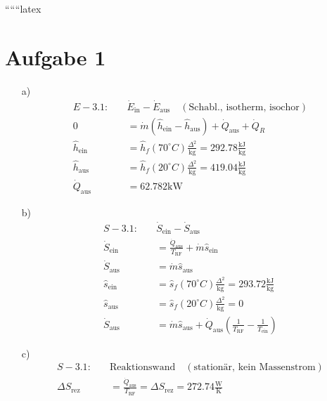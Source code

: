 
``````latex


\section*{Aufgabe 1}

\begin{itemize}
    \item[a)] 
    \begin{align*}
        E - 3.1: \quad & \dot{E}_{\text{in}} - \dot{E}_{\text{aus}} \quad (\text{Schabl., isotherm, isochor}) \\
        0 &= \dot{m} (\hat{h}_{\text{ein}} - \hat{h}_{\text{aus}}) + \dot{Q}_{\text{aus}} + \dot{Q}_R \\
        \hat{h}_{\text{ein}} &= \hat{h}_f (70^\circ C) \frac{\Delta^2}{\text{kg}} = 292.78 \frac{\text{kJ}}{\text{kg}} \\
        \hat{h}_{\text{aus}} &= \hat{h}_f (20^\circ C) \frac{\Delta^2}{\text{kg}} = 419.04 \frac{\text{kJ}}{\text{kg}} \\
        \dot{Q}_{\text{aus}} &= 62.782 \text{kW}
    \end{align*}

    \item[b)] 
    \begin{align*}
        S - 3.1: \quad & \dot{S}_{\text{ein}} - \dot{S}_{\text{aus}} \\
        \dot{S}_{\text{ein}} &= \frac{\dot{Q}_{\text{aus}}}{T_{\text{RF}}} + \dot{m} \hat{s}_{\text{ein}} \\
        \dot{S}_{\text{aus}} &= \dot{m} \hat{s}_{\text{aus}} \\
        \hat{s}_{\text{ein}} &= \hat{s}_f (70^\circ C) \frac{\Delta^2}{\text{kg}} = 293.72 \frac{\text{kJ}}{\text{kg}} \\
        \hat{s}_{\text{aus}} &= \hat{s}_f (20^\circ C) \frac{\Delta^2}{\text{kg}} = 0 \\
        \dot{S}_{\text{aus}} &= \dot{m} \hat{s}_{\text{aus}} + \dot{Q}_{\text{aus}} \left( \frac{1}{T_{\text{RF}}} - \frac{1}{T_{\text{ein}}} \right)
    \end{align*}

    \item[c)] 
    \begin{align*}
        S - 3.1: \quad & \text{Reaktionswand} \quad (\text{stationär, kein Massenstrom}) \\
        \Delta S_{\text{rez}} &= \frac{\dot{Q}_{\text{aus}}}{T_{\text{RF}}} = \Delta S_{\text{rez}} = 272.74 \frac{\text{W}}{\text{K}}
    \end{align*}


\end{itemize}
